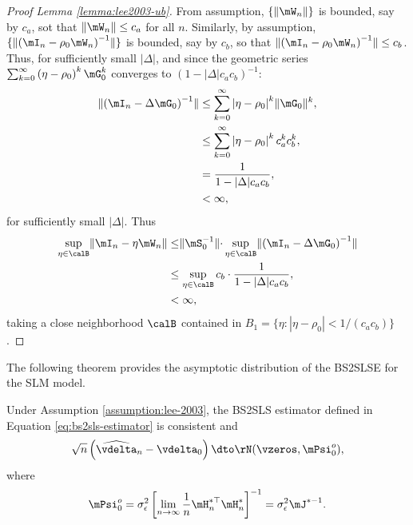 \begin{proof}[Proof Lemma \ref{lemma:lee2003-ub}]
From assumption, $\{\lVert \mW_n\rVert\}$ is bounded, say by $c_a$, sot that $\lVert \mW_n\rVert\leq c_a$ for all $n$. Similarly, by assumption, $\{\lVert \left(\mI_n - \rho_0\mW_n\right)^{-1}\rVert\}$ is bounded, say by $c_b$, so that $\lVert \left(\mI_n - \rho_0\mW_n\right)^{-1}\rVert\leq c_b$. Thus, for sufficiently small $|\Delta|$, and since the geometric series $\sum_{k = 0}^{\infty}\left(\eta-\rho_0\right)^k\mG_0^k$ converges to $(1 - |\Delta|c_ac_b)^{-1}$:
\begin{equation*}
\begin{aligned}
\lVert  \left(\mI_n - \Delta \mG_0\right)^{-1}\rVert & \leq \sum_{k = 0}^{\infty}\left|\eta-\rho_0\right|^k\rVert \mG_0\rVert^k, \\
&\leq \sum_{k = 0}^{\infty}\left|\eta-\rho_0\right|^k c_a^kc_b^k, \\
& = \frac{1}{1 - |\Delta|c_ac_b}, \\
& < \infty,
\end{aligned}
\end{equation*}
for sufficiently small $|\Delta|$. Thus
\begin{equation*}
\begin{aligned}
  \sup_{\eta \in \calB}\lVert \mI_n - \eta\mW_n \rVert & \leq \rVert \mS_0^{-1} \lVert \cdot \sup_{\eta \in \calB}\lVert  \left(\mI_n - \Delta \mG_0\right)^{-1}\rVert \\
  & \leq \sup_{\eta \in \calB} c_b \cdot \frac{1}{1 - |\Delta|c_ac_b}, \\
  & < \infty,
\end{aligned}  
\end{equation*}
%
taking a close neighborhood $\calB$ contained in $B_1 = \{\eta: |\eta - \rho_0|< 1/(c_ac_b)\}$.
\end{proof}

The following theorem provides the asymptotic distribution of the BS2SLSE for the SLM model. 

\begin{theorem}\label{teo:BS2SLS_est_slm}
Under Assumption \ref{assumption:lee-2003}, the BS2SLS estimator defined in Equation \eqref{eq:bs2sls-estimator} is consistent and
\begin{equation*}
  \sqrt{n}\left(\widehat{\vdelta}_n - \vdelta_0\right) \dto \rN(\vzeros, \mPsi_0^o), 
\end{equation*}
where
\begin{equation}\label{eq:limiting-var-b2sls}
\mPsi_0^o = \sigma_{\epsilon}^2\left[\lim_{n\to\infty} \frac{1}{n}\mH^{*\top}_n \mH_n^*\right]^{-1} = \sigma_{\epsilon}^2\mJ^{*-1}.
\end{equation}
\end{theorem}

